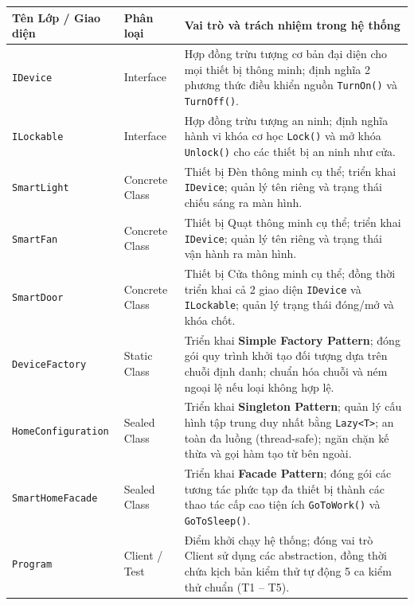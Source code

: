 \documentclass[11pt,a4paper]{article}
\begin{document}
\begin{table}[H]
\centering
\footnotesize
\renewcommand{\arraystretch}{1.12}
\begin{tabular}{>{\raggedright\arraybackslash}p{3.4cm}p{2.2cm}p{9.4cm}}
\toprule
\textbf{Tên Lớp / Giao diện} & \textbf{Phân loại} & \textbf{Vai trò và trách nhiệm trong hệ thống} \\
\midrule
\texttt{\small IDevice} & Interface & Hợp đồng trừu tượng cơ bản đại diện cho mọi thiết bị thông minh; định nghĩa 2 phương thức điều khiển nguồn \texttt{TurnOn()} và \texttt{TurnOff()}. \\
\texttt{\small ILockable} & Interface & Hợp đồng trừu tượng an ninh; định nghĩa hành vi khóa cơ học \texttt{Lock()} và mở khóa \texttt{Unlock()} cho các thiết bị an ninh như cửa. \\
\texttt{\small SmartLight} & Concrete Class & Thiết bị Đèn thông minh cụ thể; triển khai \texttt{IDevice}; quản lý tên riêng và trạng thái chiếu sáng ra màn hình. \\
\texttt{\small SmartFan} & Concrete Class & Thiết bị Quạt thông minh cụ thể; triển khai \texttt{IDevice}; quản lý tên riêng và trạng thái vận hành ra màn hình. \\
\texttt{\small SmartDoor} & Concrete Class & Thiết bị Cửa thông minh cụ thể; đồng thời triển khai cả 2 giao diện \texttt{IDevice} và \texttt{ILockable}; quản lý trạng thái đóng/mở và khóa chốt. \\
\texttt{\small DeviceFactory} & Static Class & Triển khai \textbf{Simple Factory Pattern}; đóng gói quy trình khởi tạo đối tượng dựa trên chuỗi định danh; chuẩn hóa chuỗi và ném ngoại lệ nếu loại không hợp lệ. \\
\texttt{\small HomeConfiguration} & Sealed Class & Triển khai \textbf{Singleton Pattern}; quản lý cấu hình tập trung duy nhất bằng \texttt{Lazy<T>}; an toàn đa luồng (thread-safe); ngăn chặn kế thừa và gọi hàm tạo từ bên ngoài. \\
\texttt{\small SmartHomeFacade} & Sealed Class & Triển khai \textbf{Facade Pattern}; đóng gói các tương tác phức tạp đa thiết bị thành các thao tác cấp cao tiện ích \texttt{GoToWork()} và \texttt{GoToSleep()}. \\
\texttt{\small Program} & Client / Test & Điểm khởi chạy hệ thống; đóng vai trò Client sử dụng các abstraction, đồng thời chứa kịch bản kiểm thử tự động 5 ca kiểm thử chuẩn (T1 -- T5). \\
\bottomrule
\end{tabular}
\end{table}
\end{document}

